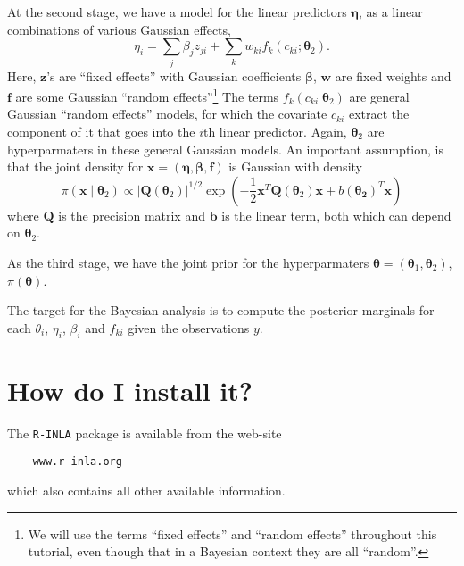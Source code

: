 \documentclass[a4paper,11pt]{report}
\newcommand{\tv}{\texttt}
\def\mm#1{\ensuremath{\boldsymbol{#1}}} %
\begin{document}
At the second stage, we have a model for the linear predictors
$\mm{\eta}$, as a linear combinations of various Gaussian effects,
\begin{displaymath}
    \eta_{i} = \sum_{j} \beta_{j} z_{ji} + \sum_{k}
    w_{ki}f_{k}(c_{ki}; \mm{\theta}_{2}).
\end{displaymath}
Here, $\mm{z}$'s are ``fixed effects'' with Gaussian coefficients
$\mm{\beta}$, $\mm{w}$ are fixed weights and $\mm{f}$ are some
Gaussian ``random effects''\footnote{We will use the terms ``fixed
    effects'' and ``random effects'' throughout this tutorial, even
    though that in a Bayesian context they are all ``random''.} The
terms $f_{k}(c_{ki}\; \mm{\theta}_{2})$ are general Gaussian ``random
effects'' models, for which the covariate $c_{ki}$ extract the
component of it that goes into the $i$th linear predictor. Again,
$\mm{\theta}_{2}$ are hyperparmaters in these general Gaussian
models. An important assumption, is that the joint density for $\mm{x}
= (\mm{\eta}, \mm{\beta}, \mm{f})$ is Gaussian with density
\begin{displaymath}
    \pi(\mm{x} \mid \mm{\theta}_{2}) \propto |\mm{Q}(\mm{\theta}_{2})|^{1/2}
    \exp\left(
      -\frac{1}{2} \mm{x}^{T}\mm{Q}(\mm{\theta}_{2}) \mm{x} +
      b(\mm{\theta_{2}})^{T} \mm{x}\right)
\end{displaymath}
where $\mm{Q}$ is the precision matrix and $\mm{b}$ is the linear
term, both which can depend on $\mm{\theta}_{2}$.

As the third stage, we have the joint prior for the hyperparmaters
$\mm{\theta} = (\mm{\theta}_{1}, \mm{\theta}_{2})$,
$\pi(\mm{\theta})$.

The target for the Bayesian analysis is to compute the posterior
marginals for each $\theta_{i}$, $\eta_{i}$, $\beta_{i}$ and $f_{ki}$
given the observations $y$.
    
\section{How do I install it?}

The \tv{R-INLA} package is available from the web-site 
\begin{verbatim}
    www.r-inla.org
\end{verbatim}
which also contains all other available information.
\end{document}
